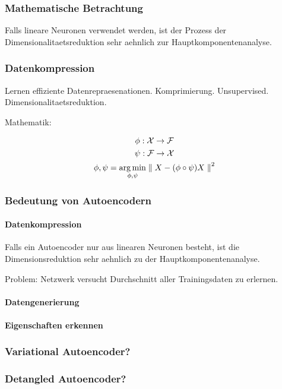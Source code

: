 \documentclass[../main]{subfiles}
\begin{document}
\subsubsection{Mathematische Betrachtung}
Falls lineare Neuronen verwendet werden, ist der Prozess der
Dimensionalitaetsreduktion sehr aehnlich zur Hauptkomponentenanalyse.

\subsubsection{Datenkompression}

Lernen effiziente Datenrepraesenationen. Komprimierung. Unsupervised.
Dimensionalitaetsreduktion.

Mathematik:


\begin{gather}
  \phi: \mathcal{X} \to \mathcal{F}\\
  \psi: \mathcal{F} \to \mathcal{X}\\
  \displaystyle\phi,\psi = \operatorname*{\arg \min}_{\phi,\psi} \parallel {X - (\phi \circ \psi)X \parallel}^2
\end{gather}

\subsubsection{Bedeutung von Autoencodern}
\paragraph{Datenkompression}
Falls ein Autoencoder nur aus linearen Neuronen besteht, ist die
Dimensionsreduktion sehr aehnlich zu der Hauptkomponentenanalyse.

Problem: Netzwerk versucht Durchschnitt aller Trainingsdaten zu erlernen.
\paragraph{Datengenerierung}
\paragraph{Eigenschaften erkennen}


\subsubsection{Variational Autoencoder?}
\subsubsection{Detangled Autoencoder?}
\end{document}
